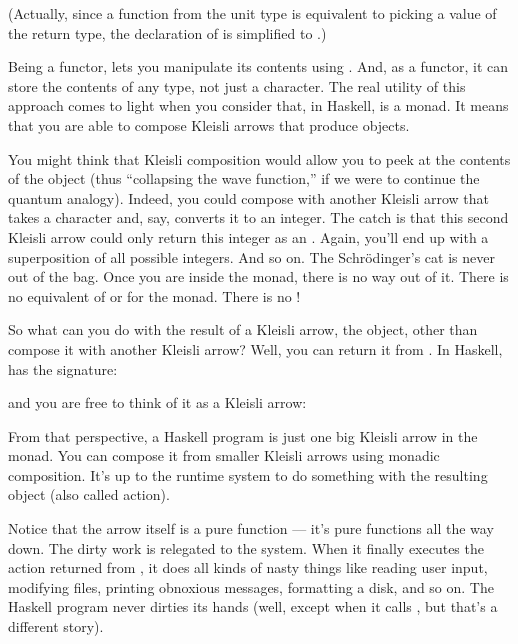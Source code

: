 (Actually, since a function from the unit type is equivalent to picking
a value of the return type, the declaration of  is
simplified to .)

Being a functor,  lets you manipulate its contents using
. And, as a functor, it can store the contents of any type,
not just a character. The real utility of this approach comes to light
when you consider that, in Haskell,  is a monad. It means
that you are able to compose Kleisli arrows that produce 
objects.

You might think that Kleisli composition would allow you to peek at the
contents of the  object (thus ``collapsing the wave
function,'' if we were to continue the quantum analogy). Indeed, you
could compose  with another Kleisli arrow that takes a
character and, say, converts it to an integer. The catch is that this
second Kleisli arrow could only return this integer as an
. Again, you'll end up with a superposition of all
possible integers. And so on. The Schrödinger's cat is never out of the
bag. Once you are inside the  monad, there is no way out of
it. There is no equivalent of  or 
for the  monad. There is no !

So what can you do with the result of a Kleisli arrow, the 
object, other than compose it with another Kleisli arrow? Well, you can
return it from . In Haskell,  has the
signature:

and you are free to think of it as a Kleisli arrow:

From that perspective, a Haskell program is just one big Kleisli arrow
in the  monad. You can compose it from smaller Kleisli arrows
using monadic composition. It's up to the runtime system to do something
with the resulting  object (also called  action).

Notice that the arrow itself is a pure function --- it's pure functions
all the way down. The dirty work is relegated to the system. When it
finally executes the  action returned from , it
does all kinds of nasty things like reading user input, modifying files,
printing obnoxious messages, formatting a disk, and so on. The Haskell
program never dirties its hands (well, except when it calls
, but that's a different story).

